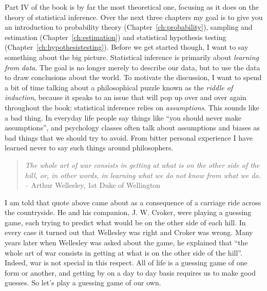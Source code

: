

\noindent
Part IV of the book is by far the most theoretical one, focusing as it does on the theory of statistical inference. Over the next three chapters my goal is to give you an introduction to probability theory (Chapter~\ref{ch:probability}), sampling and estimation (Chapter~\ref{ch:estimation}) and statistical hypothesis testing (Chapter~\ref{ch:hypothesistesting}). Before we get started though, I want to say something about the big picture. Statistical inference is primarily about {\it learning from data}. The goal is no longer merely to describe our data, but to use the data to draw conclusions about the world. To motivate the discussion, I want to spend a bit of time talking about a philosophical puzzle known as the {\it riddle of induction}, because it speaks to an issue that will pop up over and over again throughout the book: statistical inference relies on {\it assumptions}. This sounds like a bad thing. In everyday life people say things like ``you should never make assumptions'', and psychology classes often talk about assumptions and biases as bad things that we should try to avoid. From bitter personal experience I have learned never to say such things around philosophers. 


\begin{quote}
{\it The whole art of war consists in getting at what is on the other side of the hill, or, in other words, in learning what we do not know from what we do.}\\
\hspace*{2cm} -- Arthur Wellesley, 1st Duke of Wellington
\end{quote}

\noindent
I am told that quote above came about as a consequence of a carriage ride across the countryside. He and his companion, J. W. Croker, were playing a guessing game, each trying to predict what would be on the other side of each hill. In every case it turned out that Wellesley was right and Croker was wrong. Many years later when Wellesley was asked about the game, he explained that ``the whole art of war consists in getting at what is on the other side of the hill''. Indeed, war is not special in this respect. All of life is a guessing game of one form or another, and getting by on a day to day basis requires us to make good guesses. So let's play a guessing game of our own. 


